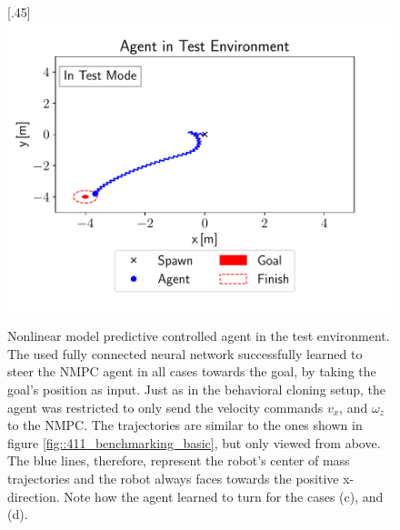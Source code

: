 \begin{figure}[h!]
	[.45\linewidth]{\includegraphics[scale=.45]{chapters/04_experiments/02_autonomous_walking/test_mode_m4_m4.pdf}}
	\caption{Nonlinear model predictive controlled agent in the test environment. The used fully connected neural network successfully learned to steer the NMPC agent in all cases towards the goal, by taking the goal's position as input. Just as in the behavioral cloning setup, the agent was restricted to only send the velocity commands $v_x$, and $\omega_z$ to the NMPC. The trajectories are similar to the ones shown in figure \ref{fig::411_benchmarking_basic}, but only viewed from above. The blue lines, therefore, represent the robot's center of mass trajectories and the robot always faces towards the positive x-direction. Note how the agent learned to turn for the cases (c), and (d).}	
	\label{fig::432_nmpc_ppo_env}
\end{figure} 
